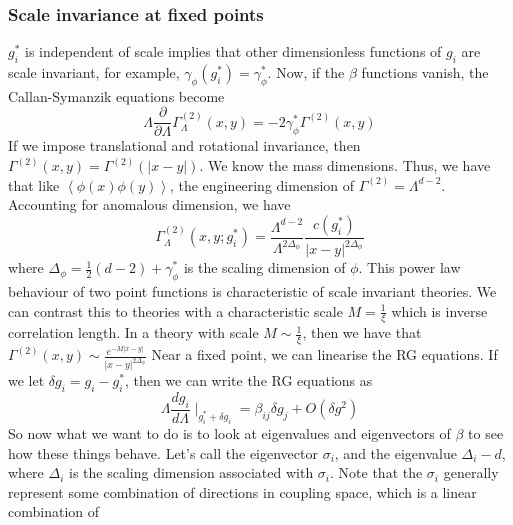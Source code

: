 \documentclass[11pt, oneside]{article}   	%
\theoremstyle{slanted}
\begin{document}
\subsubsection{Scale invariance at fixed points}
$ g _ i ^ * $ is independent of scale 
implies that other dimensionless functions 
of $ g _ i $ are scale invariant, 
for example, $ \gamma _ \phi \left( g _ i ^ *  \right)  
= \gamma _ \phi ^*  $. 
Now, if the $ \beta $ functions vanish, 
the Callan-Symanzik equations become 
\[
\Lambda \frac{\partial   }{\partial  \Lambda }  \Gamma _{ \Lambda } 
^{ \left(  2  \right)  } \left( x, y  \right)   = -  2 \gamma _ \phi ^ * 
\Gamma ^{ \left(  2  \right)  } \left( x, y  \right)  
\] If we impose translational 
and rotational invariance, 
then $ \Gamma ^{ \left(  2  \right)  } \left( x, y  \right)  
= \Gamma ^{ \left(  2  \right)  } \left( | x - y |  \right)   $. 
We know the mass dimensions. 
Thus, we have that like 
$ \left< \phi \left(  x  \right) \phi \left( y  \right)   \right>  $, 
the engineering dimension of $ \Gamma ^{ \left(  2  \right)  }    = 
\Lambda ^{ d - 2 } $. 
Accounting for anomalous dimension, 
we have 
\[
 \Gamma _{  \Lambda }^{ \left(  2  \right)   } 
 \left( x, y ; g _ i ^*   \right)  = \frac{
 \Lambda ^{ d- 2  } }{ \Lambda ^{ 2 \Delta _ \phi } } 
 \frac{ c \left(  g _ i ^ *   \right)  }{| x - y | 
 ^{ 2 \Delta _ \phi }  }
\] where $ \Delta _{ \phi }  = \frac{1}{2 } \left( d - 2  \right)  + 
\gamma _{ \phi } ^{ *  }  $  is 
the scaling dimension of $ \phi $. 
This power law behaviour of two point functions 
is characteristic of scale invariant theories. 
We can contrast this to theories with a characteristic scale
$ M  =\frac{1}{\xi } $ which is inverse correlation length. 
In a theory with scale $ M \sim \frac{1}{\xi } $, then 
we have that $ \Gamma ^{ \left(  2  \right)  } \left( x, y  \right)  
\sim \frac{e ^{ - M | x - y |  } }{ | x - y |^{ 2 \Delta _{ \phi } } }$ 
Near a fixed point, 
we can linearise the RG equations. 
If we let $ \delta g _ i  = g _ i - g _ i ^ * $, 
then we can write the RG equations as 
\[
\Lambda \frac{d g _ i  }{ d \Lambda } \mid_{ g _ i ^ * 
+ \delta g _ i }  = \beta _{ ij } \delta g_ j + O \left( \delta g ^  2  \right) 
\]  So now what we want to 
do is to look at eigenvalues and eigenvectors of $ \beta $  
to see how these things behave. 
Let's call the eigenvector $ \sigma _ i $, 
and the eigenvalue $ \Delta _ i - d  $, 
where $ \Delta _ i $ is the scaling dimension 
associated with $ \sigma _ i $. 
Note that the $ \sigma _ i $ generally 
represent some combination of 
directions in coupling space, 
which is a linear combination of 
\end{document}
